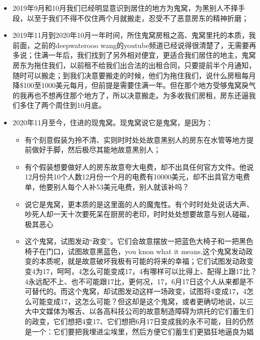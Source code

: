 \documentclass[9pt, b5paper]{article}
\begin{document}
\begin{enumerate}
\begin{enumerate}
\begin{itemize}
\item 2019年9月和10月我们已经明显意识到居住的地方为鬼窝，为黑别人不择手段，以至于我们不得不仅住两个月就搬走，忍受不了恶意房东的精神折磨；
\item 2019年11月到2020年10月一年时间，所住鬼窝房租之高、鬼窝里托的本质，我前面，之前的deepwaterooo wang的youtube频道已经说得很清楚了，无需要再多说；住满一年后，我们找到了另外相对便宜，更适合我们居住的地主，鬼窝房东为拖住我们，以前租不给我们出合法的出租合同，只要提前半个月通知，随时可以搬走；到我们决意要搬走的时候，他们为拖住我们，说什么房租每月降\$100至1000美元每月，但前提是需要住满一年。但在那个地方受够鬼窝戾气的我再也不想再住那个地方了，所以决意搬走。为多收我们房租，房东还逼我们多住了两个周住到10月底。
\item 2020年11月至今，住进的现鬼窝。现鬼窝说它是鬼窝，是因为：
\begin{itemize}
\item 有个刻意假装为拎不清、实则时时处处故意黑别人的房东在水管等地方提前做好手脚，然后极尽其能地故意黑别人；
\item 有个假装想要做好人的房东故意夸大电费，却不出具任何官方文件。他说12月份共10个人数12月份一个月的电费有10000美元，却不出具官方电费单，他要别人每个人补53美元电费，别人就该补吗？
\item 说它是鬼窝，更本质的是这里面的人的魔鬼性。有个时时处处说话大声、吵死人却一天十次要死呆在厨房的老印，时时处处想要故意与别人碰磁，极其恶心
\item 这个鬼窝，试图发动“政变”。它们会故意摆放一把蓝色大椅子和一把黑色椅子在门口，试图故意黑蓝色，you knon what it means.这个鬼窝发动政变的本质呢，就是故意破坏我极有可能的将来的幸福；它们试图发动政变变4为17，呵呵，4怎么可能变成17，4有哪样可以比得上、配得上跟17比？4永远配不上、也不可能跟17比，更何况，17，6月17日这个人从来都是不可替代的。而这个鬼窝，却试图发动这样一场政变，试图将4变成17，4怎么可能变成17，这怎么可能？但这却是这个鬼窝，或者更确切地说，以三大中文媒体为喉舌、以各高科技公司的故意制造障碍为烘托的它们蓄生们的政变，它们想把4变17、它们想把6月17日变成我的永不可能，目的仍然是一个：它们要把我埋进尘埃里，然后方便它们蓄生们更猖狂地逼良为娼
\end{itemize}
\end{itemize}
\end{enumerate}
\end{enumerate}
\end{document}

